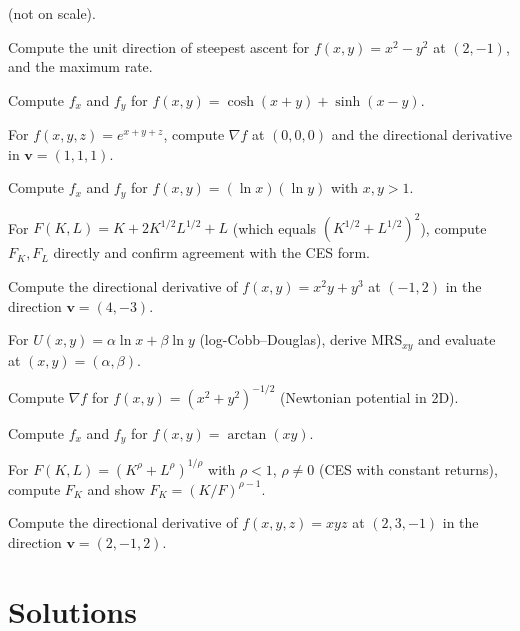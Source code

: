 \begin{problems}
        (not on scale).
  \item Compute the unit direction of steepest ascent for
        $f(x,y)=x^2-y^2$ at $(2,-1)$, and the maximum rate.
  \item Compute $f_x$ and $f_y$ for $f(x,y)=\cosh(x+y)+\sinh(x-y)$.
  \item For $f(x,y,z)=e^{x+y+z}$, compute $\nabla f$ at $(0,0,0)$ and the
        directional derivative in $\mathbf{v}=(1,1,1)$.
  \item Compute $f_x$ and $f_y$ for $f(x,y)=(\ln x)(\ln y)$ with
        $x,y>1$.
  \item For $F(K,L)=K+2K^{1/2}L^{1/2}+L$ (which equals
        $(K^{1/2}+L^{1/2})^2$), compute $F_K, F_L$ directly and confirm
        agreement with the CES form.
  \item Compute the directional derivative of $f(x,y)=x^2y+y^3$ at
        $(-1,2)$ in the direction $\mathbf{v}=(4,-3)$.
  \item For $U(x,y)=\alpha\ln x+\beta\ln y$ (log-Cobb--Douglas), derive
        $\mathrm{MRS}_{xy}$ and evaluate at $(x,y)=(\alpha,\beta)$.
  \item Compute $\nabla f$ for $f(x,y)=(x^2+y^2)^{-1/2}$ (Newtonian
        potential in 2D).
  \item Compute $f_x$ and $f_y$ for $f(x,y)=\arctan(xy)$.
  \item For $F(K,L)=(K^\rho+L^\rho)^{1/\rho}$ with $\rho<1$, $\rho\neq0$
        (CES with constant returns), compute $F_K$ and show
        $F_K=(K/F)^{\rho-1}$.
  \item Compute the directional derivative of $f(x,y,z)=xyz$ at
        $(2,3,-1)$ in the direction $\mathbf{v}=(2,-1,2)$.
\end{problems}

\section{Solutions}

